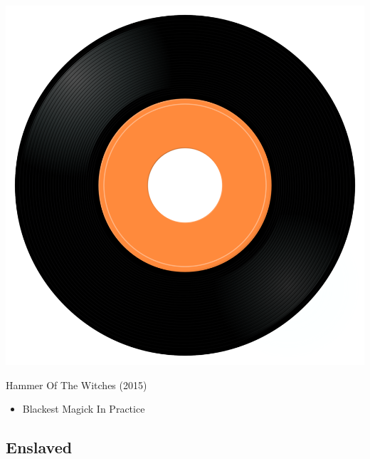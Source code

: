 \begin{minipage}[t]{0.25\textwidth}\vspace{0pt}
\captionsetup{type=figure}
\includegraphics[width=\textwidth]{Images/cover.png}
\caption*{Hammer Of The Witches (2015)}
\end{minipage}
\begin{minipage}[t]{0.25\textwidth}\vspace{0pt}
\begin{itemize}[nosep,leftmargin=1em,labelwidth=*,align=left]
	\setlength{\itemsep}{0pt}
	\item Blackest Magick In Practice
\end{itemize}
\end{minipage}

\subsection{Enslaved}

